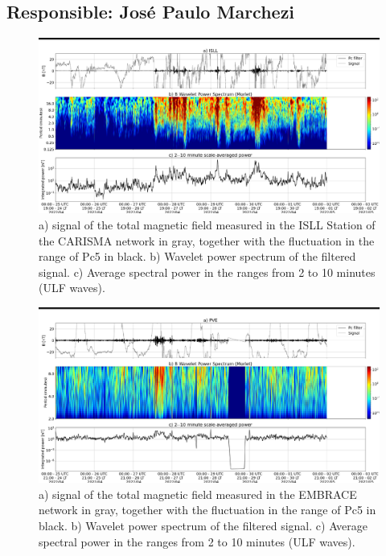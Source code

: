 \documentclass[11pt, oneside]{article}
\begin{document}
 \subsection{Responsible: José Paulo Marchezi} 
 
\begin{figure}[H]
    
                        \centering
   
                             \includegraphics[width=14cm]{./figures//figureULF_0.png}

                             \caption{a) signal of the total magnetic 
                              field measured in the ISLL Station of the CARISMA 
                              network in gray, together with the fluctuation in the 
                              range of Pc5 in black. b) Wavelet power spectrum of the 
                              filtered signal. c) Average spectral power in the ranges 
                              from 2 to 10 minutes (ULF waves).}
                        \end{figure}

                     \begin{figure}[H]
    
                        \centering
   
                             \includegraphics[width=14cm]{./figures//figureULF_1.png}

                             \caption{a) signal of the total magnetic field 
                              measured in the EMBRACE network in gray, together with
                               the fluctuation in the range of Pc5 in black. b)
                                Wavelet power spectrum of the filtered signal. c) 
                                Average spectral power in the ranges from 2 to 10
                                 minutes (ULF waves).}
                        \end{figure}
\end{document}

